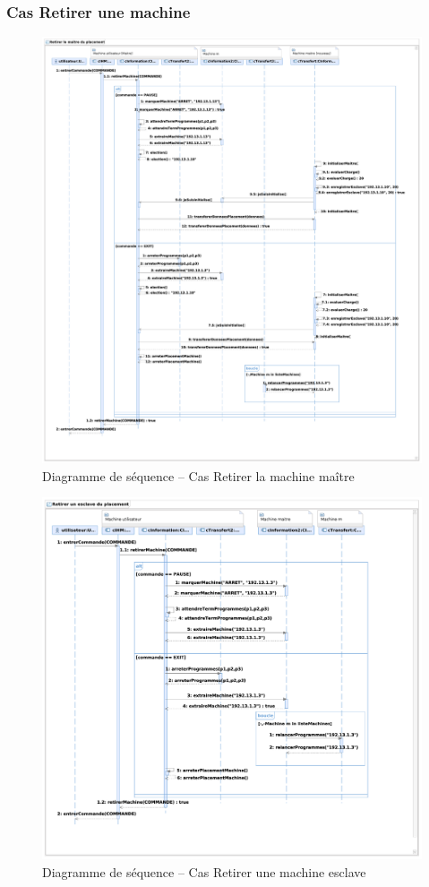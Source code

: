  \subsubsection{Cas Retirer une machine}

  \begin{figure}[h!]
    \centering
    \includegraphics[width=\textwidth]{img/analyse_DSseqretirerMaitre.pdf}
    \caption{Diagramme de séquence -- Cas Retirer la machine maître} 
  \end{figure}
  
  \begin{figure}[h!]
    \centering
    \includegraphics[width=\textwidth]{img/analyse_DSseqretireresclave.pdf}
    \caption{Diagramme de séquence -- Cas Retirer une machine esclave}
  \end{figure}


